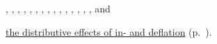 
\scriptsize{
	,
	,
	,
	,
	,
	,
	,
	,
	,
	,
	,
	,
	,
	,
	,
	 and

	\hyperref[sec:distributive-effects-of-inflation]{the distributive effects of in- and deflation} (p.~\pageref{sec:distributive-effects-of-inflation}).
}